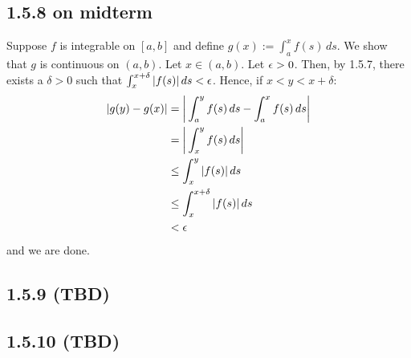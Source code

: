 \documentclass[11pt]{article}
\begin{document}
\subsection*{1.5.8 on midterm}

Suppose $f$ is integrable on $[a,b]$ and define $g(x) := \int_a^x f(s) \,ds$. We show that $g$ is continuous on $(a,b)$. Let $x \in (a,b)$. Let $\epsilon > 0$. Then, by 1.5.7, there exists a $\delta > 0$ such that $\int_{x}^{x + \delta} |f(s)|  \,ds < \epsilon$. Hence, if $x <y <x+\delta$: \begin{align*}
    |g(y) - g(x)| &= \bigg| \int_a^y f(s) \,ds - \int_a^x f(s) \,ds\bigg| \\
    &= \bigg| \int_x^y f(s) \,ds \bigg|\\
    &\leq  \int_x^y |f(s)| \,ds \\
    &\leq \int_x^{x+\delta} |f(s)| \,ds \\
    &< \epsilon
\end{align*} and we are done.

\subsection*{1.5.9 (TBD)}
\subsection*{1.5.10 (TBD)}
\end{document}
